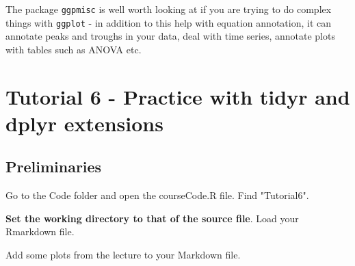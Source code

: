 \documentclass[titlepage]{book}\usepackage{knitr}
\begin{document}
The package \texttt{ggpmisc} is well worth looking at if you are trying to do complex things with \texttt{ggplot} - in addition to this help with equation annotation, it can annotate peaks and troughs in your data, deal with time series, annotate plots with tables such as ANOVA etc.









\chapter{Tutorial 6 - Practice with tidyr and dplyr extensions}\label{T6}

\author{Brian Williams $<$\href{mailto:bjw649@gmail.com}%
{bjw649@gmail.com}$>$}

\section{Preliminaries}

Go to the Code folder and open the courseCode.R file.  Find "Tutorial6".

\textbf{Set the working directory to that of the source file}. 
Load your Rmarkdown file.


\begin{knitrout}
\color{fgcolor}\begin{kframe}
\begin{alltt}
\hlstd{(}\hlstd{)}
 \hlkwb{<-} 
\end{alltt}
\end{kframe}
\end{knitrout}

Add some plots from the lecture to your Markdown file.





\end{document}

